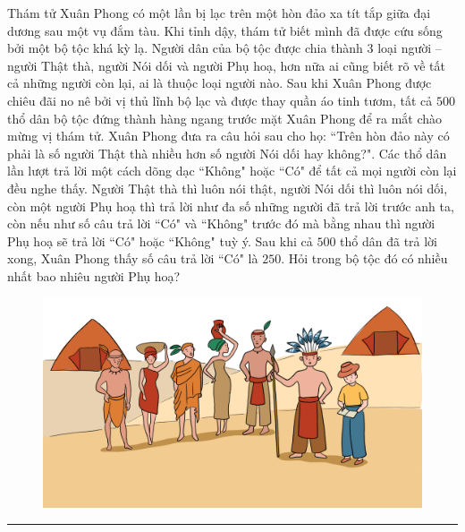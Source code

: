 \begin{multicols}{2}
	Thám tử Xuân Phong có một lần bị lạc trên một hòn đảo xa tít tắp giữa đại dương sau một vụ đắm tàu. Khi tỉnh dậy, thám tử biết mình đã được cứu sống bởi một bộ tộc khá kỳ lạ. Người dân của bộ tộc được chia thành $3$ loại người -- người Thật thà, người Nói dối và người Phụ hoạ, hơn nữa ai cũng biết rõ về tất cả những người còn lại, ai là thuộc loại người nào. Sau khi Xuân Phong được chiêu đãi no nê bởi vị thủ lĩnh bộ lạc và được thay quần áo tinh tươm, tất cả $500$ thổ dân bộ tộc đứng thành hàng ngang trước mặt Xuân Phong để ra mắt chào mừng vị thám tử. Xuân Phong đưa ra câu hỏi sau cho họ: ``Trên hòn đảo này có phải là số người Thật thà nhiều hơn số người Nói dối hay không?". Các thổ dân lần lượt trả lời một cách dõng dạc  ``Không" hoặc ``Có" để tất cả mọi người còn lại đều nghe thấy. 
	\vskip 0.1cm
	Người Thật thà thì luôn nói thật, người Nói dối thì luôn nói dối, còn một người Phụ hoạ thì trả lời như đa số những người đã trả lời trước anh ta, còn nếu như số câu trả lời ``Có" và ``Không" trước đó mà bằng nhau thì người Phụ hoạ sẽ trả lời ``Có" hoặc ``Không" tuỳ ý. 
	\vskip 0.1cm
	Sau khi cả $500$ thổ dân đã trả lời xong, Xuân Phong thấy số câu trả lời ``Có" là $250$. Hỏi trong bộ tộc đó có nhiều nhất bao nhiêu người Phụ hoạ?
	\begin{figure}[H]
		\centering
		\vspace*{-5pt}
		\captionsetup{labelformat= empty, justification=centering}
		\includegraphics[width=1\linewidth]{xp}
	\end{figure}
\end{multicols}
\vspace*{-10pt}
{\color{toancuabi}\rule{1\linewidth}{0.1pt}}
\begingroup
